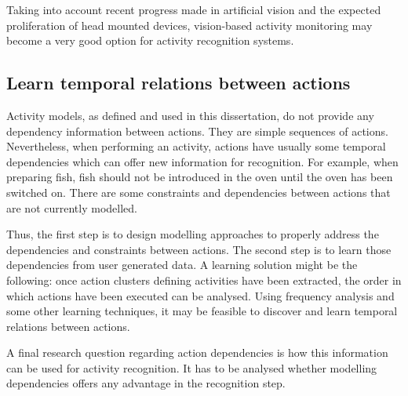 Taking into account recent progress made in artificial vision and the expected proliferation of head mounted devices, vision-based activity monitoring may become a very good option for activity recognition systems.

\subsection{Learn temporal relations between actions}

Activity models, as defined and used in this dissertation, do not provide any dependency information between actions. They are simple sequences of actions. Nevertheless, when performing an activity, actions have usually some temporal dependencies which can offer new information for recognition. For example, when preparing fish, fish should not be introduced in the oven until the oven has been switched on. There are some constraints and dependencies between actions that are not currently modelled.

Thus, the first step is to design modelling approaches to properly address the dependencies and constraints between actions. The second step is to learn those dependencies from user generated data. A learning solution might be the following: once action clusters defining activities have been extracted, the order in which actions have been executed can be analysed. Using frequency analysis and some other learning techniques, it may be feasible to discover and learn temporal relations between actions. 

A final research question regarding action dependencies is how this information can be used for activity recognition. It has to be analysed whether modelling dependencies offers any advantage in the recognition step.
